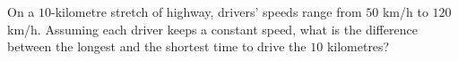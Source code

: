 On a $10$-kilometre stretch of highway, drivers' speeds range from $50$ km/h to $120$ km/h. Assuming each driver keeps a constant speed, what is the difference between the longest and the shortest time to drive the $10$ kilometres?

